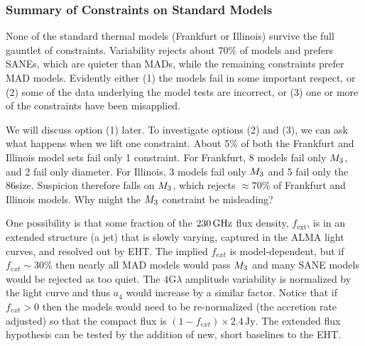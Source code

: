 
\subsubsection{Summary of Constraints on Standard Models}

None of the standard thermal models (Frankfurt or Illinois) survive the full gauntlet of constraints.   Variability rejects about $70\%$ of models and prefers SANEs, which are quieter than MADs, while the remaining constraints prefer MAD models.
Evidently either (1) the models fail in some important respect, or (2) some of the data underlying the model tests are incorrect, or (3) one or more of the constraints have been misapplied.

We will discuss option (1) later.  To investigate options (2) and (3), we can ask what happens when we lift one constraint.  About 5\% of both the Frankfurt and Illinois model sets fail only 1 constraint.  For Frankfurt, 8 models fail only $M_{3}$, and 2 fail only \mring diameter.  For Illinois, 3 models fail only $M_{3}$ and 5 fail only the 86\GHz size.  Suspicion therefore falls on $M_{3}$, which rejects $\approx 70\%$ of Frankfurt and Illinois models.  Why might the $M_{3}$ constraint be misleading?

One possibility is that some fraction of the $230\,\mathrm{GHz}$ flux density, $f_\mathrm{ext}$, is in an extended structure (a jet) that is slowly varying, captured in the ALMA light curves, and resolved out by EHT.  The implied $f_{ext}$ is model-dependent, but if $f_{ext} \sim 30\%$ then nearly all MAD models would pass $M_{3}$ and many SANE models would be rejected as too quiet.  The $4$G$\lambda$ amplitude variability is normalized by the light curve and thus $a_4$ would increase by a similar factor.  Notice that if $f_{ext} > 0$ then the models would need to be re-normalized (the accretion rate adjusted) so that the compact flux is $(1 - f_{ext}) \times 2.4\,\mathrm{Jy}$.  The extended flux hypothesis can be tested by the addition of new, short baselines to the EHT.

